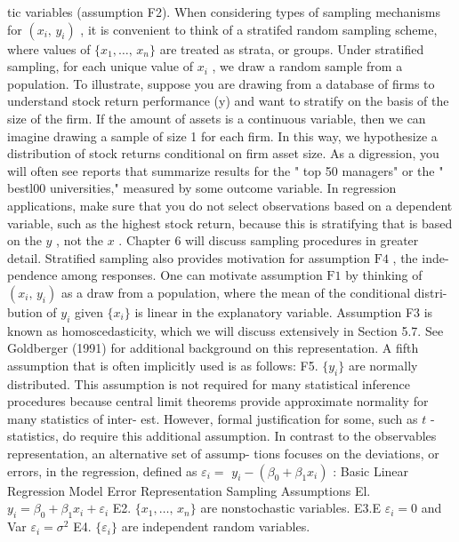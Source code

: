 \documentclass[11pt]{article}
\begin{document}
tic variables (assumption F2). When considering types of sampling mechanisms
for \(( x_{i} , \, y_{i} )\) , it is convenient to think of a stratifed random sampling scheme, where
 values of \(\{x_{1} , \dots, \, x_{n} \}\) are treated as strata, or groups. Under stratified sampling,
for each unique value of \(x_{i}\) , we draw a random sample from a population. To
 illustrate, suppose you are drawing from a database of firms to understand stock
return performance (y) and want to stratify on the basis of the size of the firm.
If the amount of assets is a continuous variable, then we can imagine drawing a
sample of size 1 for each firm. In this way, we hypothesize a distribution of stock
returns conditional on firm asset size.
 As a digression, you will often see reports that summarize results for the " top
50 managers" or the " bestl00 universities," measured by some outcome variable.
In regression applications, make sure that you do not select observations based on
a dependent variable, such as the highest stock return, because this is stratifying
 that is based on the \(y\) , not the \(x\) . Chapter \(6\) will discuss sampling procedures in
 greater detail.
Stratified sampling also provides motivation for assumption \(\mathrm{F 4}\) , the inde-
pendence among responses. One can motivate assumption \(\mathrm{F 1}\) by thinking of
\(( x_{i} , \, y_{i} )\) as a draw from a population, where the mean of the conditional distri-
bution of \(y_{i}\) given \(\{x_{i} \}\) is linear in the explanatory variable. Assumption F3 is
known as homoscedasticity, which we will discuss extensively in Section 5.7. See
Goldberger (1991) for additional background on this representation.
A fifth assumption that is often implicitly used is as follows:
F5. \(\{y_{i} \}\) are normally distributed.
 This assumption is not required for many statistical inference procedures because
central limit theorems provide approximate normality for many statistics of inter-
est. However, formal justification for some, such as \(t\) -statistics, do require this
 additional assumption.
In contrast to the observables representation, an alternative set of assump-
tions focuses on the deviations, or errors, in the regression, defined as \(\varepsilon_{i}=\)
\(y_{i}-( \beta_{0}+\beta_{1} x_{i} )\) :
 Basic Linear Regression Model
Error Representation Sampling Assumptions
El. \(y_{i}=\beta_{0}+\beta_{1} x_{i}+\varepsilon_{i}\)
E2. \(\{x_{1} , \dots, \, x_{n} \}\) are nonstochastic variables.
E3.E \(\varepsilon_{i}=0\) and Var \(\varepsilon_{i}=\sigma^{2}\)
E4. \(\{\varepsilon_{i} \}\) are independent random variables.
\end{document}
